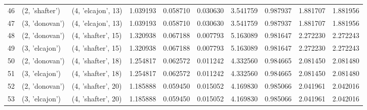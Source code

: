 \begin{tabular}{lllrrrrrrr}
46 &   (2, 'shafter') &  (4, 'elcajon', 13) &  1.039193 &  0.058710 &  0.030630 &   3.541759 &  0.987937 &  1.881707 &  1.881956 \\
47 &   (3, 'donovan') &  (4, 'elcajon', 13) &  1.039193 &  0.058710 &  0.030630 &   3.541759 &  0.987937 &  1.881707 &  1.881956 \\
48 &   (2, 'donovan') &  (4, 'shafter', 15) &  1.320938 &  0.067188 &  0.007793 &   5.163089 &  0.981647 &  2.272230 &  2.272243 \\
49 &   (3, 'elcajon') &  (4, 'shafter', 15) &  1.320938 &  0.067188 &  0.007793 &   5.163089 &  0.981647 &  2.272230 &  2.272243 \\
50 &   (2, 'donovan') &  (4, 'shafter', 18) &  1.254817 &  0.062572 &  0.011242 &   4.332560 &  0.984665 &  2.081450 &  2.081480 \\
51 &   (3, 'elcajon') &  (4, 'shafter', 18) &  1.254817 &  0.062572 &  0.011242 &   4.332560 &  0.984665 &  2.081450 &  2.081480 \\
52 &   (2, 'donovan') &  (4, 'shafter', 20) &  1.185888 &  0.059450 &  0.015052 &   4.169830 &  0.985066 &  2.041961 &  2.042016 \\
53 &   (3, 'elcajon') &  (4, 'shafter', 20) &  1.185888 &  0.059450 &  0.015052 &   4.169830 &  0.985066 &  2.041961 &  2.042016 \\
\bottomrule
\end{tabular}
